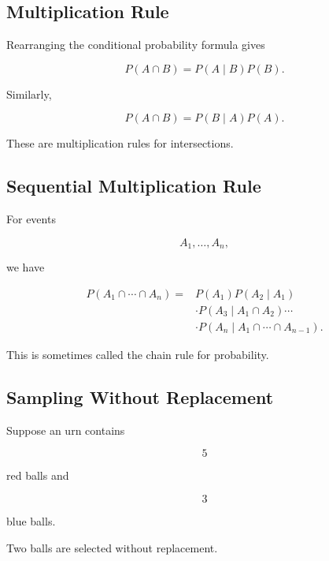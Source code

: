 \subsection{Multiplication Rule}
\label{subsec:multiplication-rule}

Rearranging the conditional probability formula gives

\[
\boxed{
P(A\cap B)
=
P(A\mid B)P(B).
}
\]

Similarly,

\[
\boxed{
P(A\cap B)
=
P(B\mid A)P(A).
}
\]

These are multiplication rules for intersections.

\subsection{Sequential Multiplication Rule}
\label{subsec:sequential-multiplication-rule}

For events

\[
A_1,\ldots,A_n,
\]

we have

\[
\boxed{
\begin{aligned}
P(A_1\cap\cdots\cap A_n)
={}&
P(A_1)
P(A_2\mid A_1)
\\
&\cdot
P(A_3\mid A_1\cap A_2)
\cdots
\\
&\cdot
P(A_n\mid A_1\cap\cdots\cap A_{n-1}).
\end{aligned}
}
\]

This is sometimes called the chain rule for probability.

\subsection{Sampling Without Replacement}
\label{subsec:sampling-without-replacement}

Suppose an urn contains

\[
5
\]

red balls and

\[
3
\]

blue balls.

Two balls are selected without replacement.


